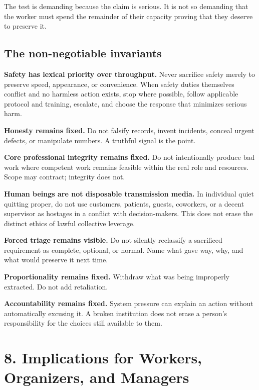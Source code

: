 \documentclass[11pt,oneside]{article}
\begin{document}
The test is demanding because the claim is serious. It is not so
demanding that the worker must spend the remainder of their capacity
proving that they deserve to preserve it.

\hypertarget{the-non-negotiable-invariants}{%
\subsection{The non-negotiable
invariants}\label{the-non-negotiable-invariants}}

\textbf{Safety has lexical priority over throughput.} Never sacrifice
safety merely to preserve speed, appearance, or convenience. When safety
duties themselves conflict and no harmless action exists, stop where
possible, follow applicable protocol and training, escalate, and choose
the response that minimizes serious harm.

\textbf{Honesty remains fixed.} Do not falsify records, invent
incidents, conceal urgent defects, or manipulate numbers. A truthful
signal is the point.

\textbf{Core professional integrity remains fixed.} Do not intentionally
produce bad work where competent work remains feasible within the real
role and resources. Scope may contract; integrity does not.

\textbf{Human beings are not disposable transmission media.} In
individual quiet quitting proper, do not use customers, patients,
guests, coworkers, or a decent supervisor as hostages in a conflict with
decision-makers. This does not erase the distinct ethics of lawful
collective leverage.

\textbf{Forced triage remains visible.} Do not silently reclassify a
sacrificed requirement as complete, optional, or normal. Name what gave
way, why, and what would preserve it next time.

\textbf{Proportionality remains fixed.} Withdraw what was being
improperly extracted. Do not add retaliation.

\textbf{Accountability remains fixed.} System pressure can explain an
action without automatically excusing it. A broken institution does not
erase a person's responsibility for the choices still available to them.

\hypertarget{implications-for-workers-organizers-and-managers}{%
\section{8. Implications for Workers, Organizers, and
Managers}\label{implications-for-workers-organizers-and-managers}}
\end{document}
